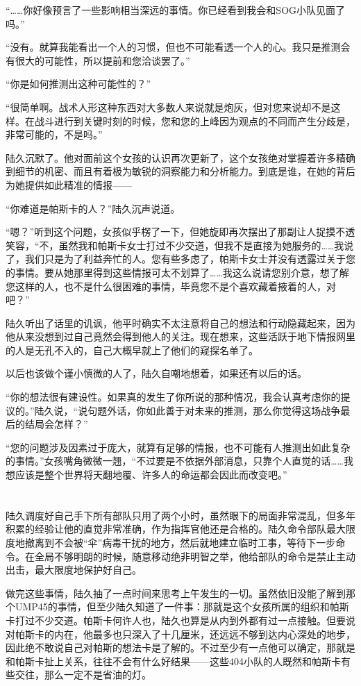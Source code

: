 “……你好像预言了一些影响相当深远的事情。你已经看到我会和SOG小队见面了吗。”

“没有。就算我能看出一个人的习惯，但也不可能看透一个人的心。我只是推测会有很大的可能性，所以提前和您洽谈罢了。”

“你是如何推测出这种可能性的？”

“很简单啊。战术人形这种东西对大多数人来说就是炮灰，但对您来说却不是这样。在战斗进行到关键时刻的时候，您和您的上峰因为观点的不同而产生分歧是，非常可能的，不是吗。”

陆久沉默了。他对面前这个女孩的认识再次更新了，这个女孩绝对掌握着许多精确到细节的机密、而且有着极为敏锐的洞察能力和分析能力。到底是谁，在她的背后为她提供如此精准的情报——

“你难道是帕斯卡的人？”陆久沉声说道。

“嗯？”听到这个问题，女孩似乎楞了一下，但她旋即再次摆出了那副让人捉摸不透笑容，“不，虽然我和帕斯卡女士打过不少交道，但我不是直接为她服务的……我说了，我们只是为了利益奔忙的人。您有些多虑了，帕斯卡女士并没有透露过关于您的事情。要从她那里得到这些情报可太不划算了……我这么说请您别介意，想了解您这样的人，也不是什么很困难的事情，毕竟您不是个喜欢藏着掖着的人，对吧？”

陆久听出了话里的讥讽，他平时确实不太注意将自己的想法和行动隐藏起来，因为他从来没想到过自己竟然会得到他人的关注。现在想来，这些活跃于地下情报网里的人是无孔不入的，自己大概早就上了他们的窥探名单了。

以后也该做个谨小慎微的人了，陆久自嘲地想着，如果还有以后的话。

“你的想法很有建设性。如果真的发生了你所说的那种情况，我会认真考虑你的提议的。”陆久说，“说句题外话，你如此善于对未来的推测，那么你觉得这场战争最后的结局会怎样？”

“您的问题涉及因素过于庞大，就算有足够的情报，也不可能有人推测出如此复杂的事情。”女孩嘴角微微一翘，“不过要是不依据外部消息，只靠个人直觉的话……我想应该是整个世界将天翻地覆、许多人的命运都会因此而改变吧。”

\section*{}

陆久调度好自己手下所有部队只用了两个小时，虽然眼下的局面非常混乱，但多年积累的经验让他的直觉非常准确，作为指挥官他还是合格的。陆久命令部队最大限度地撤离到不会被“伞”病毒干扰的地方，然后就地建立临时工事，等待下一步命令。在全局不够明朗的时候，随意移动绝非明智之举，他给部队的命令是禁止主动出击，最大限度地保护好自己。

做完这些事情，陆久抽了一点时间来思考上午发生的一切。虽然依旧没能了解到那个UMP45的事情，但至少陆久知道了一件事：那就是这个女孩所属的组织和帕斯卡打过不少交道。帕斯卡何许人也，陆久也算是从内到外都有过一点接触。但要说对帕斯卡的内在，他最多也只深入了十几厘米，还远远不够到达内心深处的地步，因此绝不敢说自己对帕斯的想法卡是了解的。不过至少有一点他可以确定，那就是和帕斯卡扯上关系，往往不会有什么好结果——这些404小队的人既然和帕斯卡有些交往，那么一定不是省油的灯。

